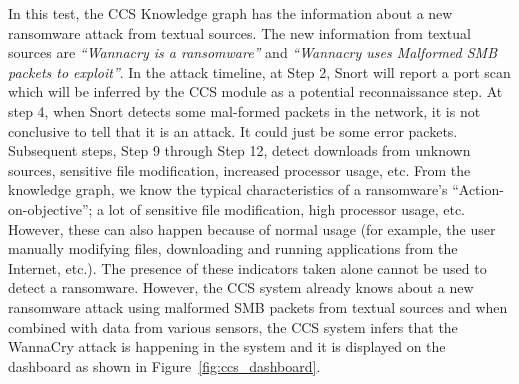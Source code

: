 In this test, the CCS Knowledge graph has the information about a new ransomware attack from textual sources. The new information from textual sources are \textit{``Wannacry is a ransomware''} and \textit{``Wannacry uses Malformed SMB packets to exploit''}. In the attack timeline, at Step 2, Snort will report a port scan which will be inferred by the CCS module as a potential reconnaissance step. At step 4, when Snort detects some mal-formed packets in the network, it is not conclusive to tell that it is an attack. It could just be some error packets. Subsequent steps, Step 9 through Step 12,  detect downloads from unknown sources, sensitive file modification, increased processor usage, etc. From the knowledge graph, we know the typical characteristics of a ransomware's ``Action-on-objective''; a lot of sensitive file modification, high processor usage, etc. However, these can also happen because of normal usage (for example, the user manually modifying files, downloading and running applications from the Internet, etc.). The presence of these indicators taken alone cannot be used to detect a ransomware. However, the CCS system already knows about a new ransomware attack using malformed SMB packets from textual sources and when combined with data from various sensors, the CCS system infers that the WannaCry attack is happening in the system and it is displayed on the dashboard as shown in Figure~\ref{fig:ccs_dashboard}. %